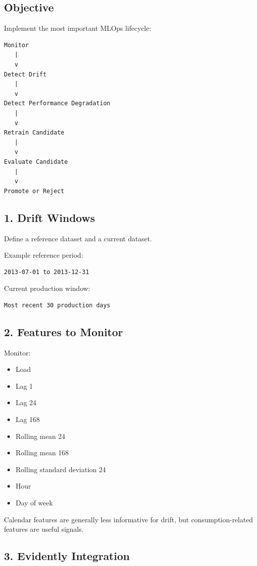\documentclass[11pt,a4paper]{article}
\begin{document}
\subsection{Objective}

Implement the most important MLOps lifecycle:

\begin{verbatim}
Monitor
   |
   v
Detect Drift
   |
   v
Detect Performance Degradation
   |
   v
Retrain Candidate
   |
   v
Evaluate Candidate
   |
   v
Promote or Reject
\end{verbatim}

\subsection{1. Drift Windows}

Define a reference dataset and a current dataset.

Example reference period:

\begin{lstlisting}
2013-07-01 to 2013-12-31
\end{lstlisting}

Current production window:

\begin{lstlisting}
Most recent 30 production days
\end{lstlisting}

\subsection{2. Features to Monitor}

Monitor:

\begin{itemize}
    \item Load
    \item Lag 1
    \item Lag 24
    \item Lag 168
    \item Rolling mean 24
    \item Rolling mean 168
    \item Rolling standard deviation 24
    \item Hour
    \item Day of week
\end{itemize}

Calendar features are generally less informative for drift, but consumption-related features are useful signals.

\subsection{3. Evidently Integration}
\end{document}
